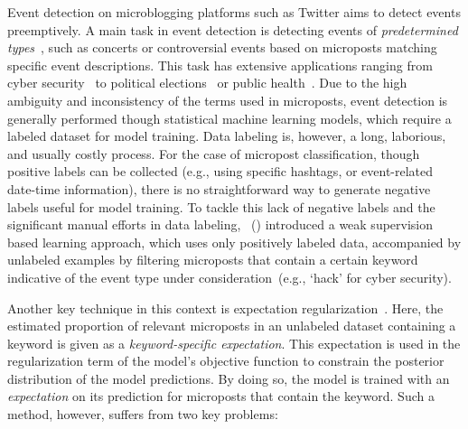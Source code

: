 \documentclass[letterpaper]{article}
\begin{document}
Event detection on microblogging platforms such as Twitter aims to detect events preemptively. A main task in event detection is detecting events of \textit{predetermined types}~\cite{atefeh2015survey}, such as concerts or controversial events based on microposts matching specific event descriptions. This task has extensive applications ranging from cyber security~\cite{ritter2015weakly,chambers2018detecting} to political elections~\cite{konovalov2017learning} or public health~\cite{akbari2016tweets,lee2017adverse}. Due to the high ambiguity and inconsistency of the terms used in microposts, event detection is generally performed though statistical machine learning models, which require a labeled dataset for model training. Data labeling is, however, a long, laborious, and usually costly process. %
For the case of micropost classification, though positive labels can be collected (e.g., using specific hashtags, or event-related date-time information), there is no straightforward way to generate negative labels useful for model training. To tackle this lack of negative labels and the significant manual efforts in data labeling,~\citeauthor{ritter2015weakly} (\citeyear{ritter2015weakly,konovalov2017learning}) introduced a weak supervision based learning approach, which uses only positively labeled data, accompanied by unlabeled examples by filtering microposts that contain a certain keyword indicative of the event type under consideration~(e.g., \lq hack' for cyber security). %

Another key technique in this context is expectation regularization~\cite{mann2007simple,druck2008learning,ritter2015weakly}. Here, the estimated proportion of relevant microposts in an unlabeled dataset containing a keyword is given as a \emph{keyword-specific expectation}. This expectation is used in the regularization term of the model's objective function to constrain the posterior distribution of the model predictions. By doing so, the model is trained with an \emph{expectation} on its prediction for microposts that contain the keyword. Such a method, however, suffers from two key problems:
\end{document}
